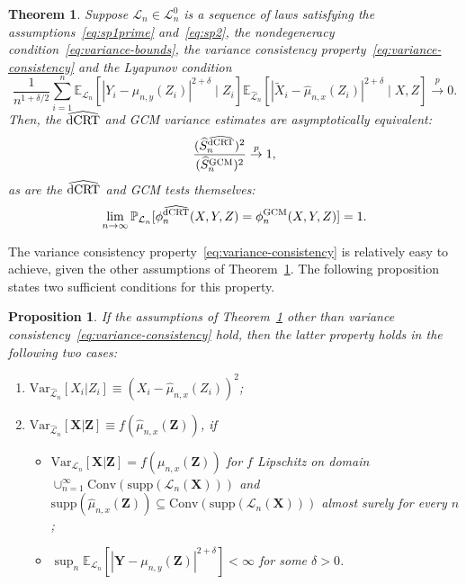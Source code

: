 \documentclass[aos]{imsart}
\theoremstyle{plain}
\newtheorem{theorem}{Theorem}
\newtheorem{proposition}{Proposition}
\theoremstyle{remark}
\newcommand{\E}{\mathbb E}								%
\newcommand{\V}{\mathrm{Var}}							%
\renewcommand{\P}{\mathbb{P}}							%
\newcommand{\convp}{\overset p \rightarrow}             %
\newcommand{\prx}{\bm X}								%
\newcommand{\srx}{X}									%
\newcommand{\prz}{\bm Z}								%
\newcommand{\srz}{Z}									%
\newcommand{\srxk}{\widetilde X}						%
\newcommand{\pry}{{\bm Y}}								%
\newcommand{\sry}{Y}									%
\newcommand{\law}{\mathcal L}							%
\newcommand{\nulllaws}{\mathscr L^0}					%
\newcommand{\lawhat}{\widehat{\mathcal L}}				%
\newcommand{\GCM}{\textnormal{GCM}}						%
\newcommand{\dCRThat}{\widehat{\textnormal{dCRT}}}		%
\begin{document}
\begin{theorem} \label{thm:equivalence}
    Suppose $\law_n \in \nulllaws_n$ is a sequence of laws satisfying the assumptions~\eqref{eq:sp1prime} and~\eqref{eq:sp2}, the nondegeneracy condition~\eqref{eq:variance-bounds}, the variance consistency property~\eqref{eq:variance-consistency} and the Lyapunov condition 
    \begin{equation}
        \frac{1}{n^{1+\delta/2}} \sum_{i=1}^n \E_{\law_n}\left[|\sry_i-\mu_{n,y}(\srz_i)|^{2+\delta}\mid \srz_i\right]\E_{\lawhat_n}[|\srxk_i-\widehat\mu_{n,x}(\srz_i)|^{2+\delta}\mid \srx,\srz] \convp 0.
        \label{eq:lyapunov-condition-2} \tag{Lyap-2}
    \end{equation}
    Then, the $\dCRThat$ and GCM variance estimates are asymptotically equivalent:
    \begin{equation}
        \frac{(\widehat S_n^{\dCRThat})^2}{(\widehat S_{n}^{\GCM})^2} \convp 1,
        \label{eq:asymptotic-variance-equivalence}
    \end{equation}
    as are the $\dCRThat$ and GCM tests themselves:
    \begin{equation}
        \lim_{n \rightarrow \infty} \P_{\law_n}[\phi^{\dCRThat}_{n}(\srx, \sry, \srz) = \phi^{\GCM}_{n}(\srx, \sry, \srz)] = 1.
        \label{eq:asymptotic-test-equivalence}
    \end{equation}
\end{theorem}

The variance consistency property~\eqref{eq:variance-consistency} is relatively easy to achieve, given the other assumptions of Theorem~\ref{thm:equivalence}. The following proposition states two sufficient conditions for this property.

\begin{proposition} \label{prop:sufficient-for-variance-consistency} 
    If the assumptions of Theorem~\ref{thm:equivalence} other than variance consistency~\eqref{eq:variance-consistency} hold, then the latter property holds in the following two cases:
    \begin{enumerate}
        \item $\V_{\lawhat_n}[\srx_i|\srz_i] \equiv (\srx_i - \widehat \mu_{n,x}(\srz_i))^2$;
        \item $\V_{\lawhat_n}[\prx|\prz] \equiv f(\widehat \mu_{n,x}(\prz))$, if 
        \begin{itemize}
            \item $\V_{\law_n}[\prx|\prz] = f(\mu_{n,x}(\prz))$ for $f$ Lipschitz on domain $\cup_{n=1}^{\infty}\mathrm{Conv}(\mathrm{supp}(\law_{n}(\prx)))$ and $\mathrm{supp}(\widehat \mu_{n,x}(\prz))\subseteq\mathrm{Conv}(\mathrm{supp}(\law_{n}(\prx)))$ almost surely for every $n$;
            \item $\sup_n \E_{\law_n}[|\pry-\mu_{n,y}(\prz)|^{2+\delta}] < \infty$ for some $\delta > 0$.
        \end{itemize}
    \end{enumerate} 
\end{proposition}
\end{document}
